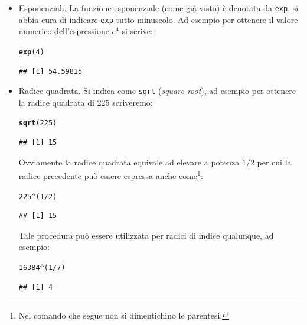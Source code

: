 \documentclass[onecolumn,11pt]{book}\usepackage[]{graphicx}\usepackage[]{color}
\makeatletter
\newcommand{\hlnum}[1]{\textcolor[rgb]{0.686,0.059,0.569}{#1}}%
\newcommand{\hlopt}[1]{\textcolor[rgb]{0,0,0}{#1}}%
\newcommand{\hlstd}[1]{\textcolor[rgb]{0.345,0.345,0.345}{#1}}%
\newcommand{\hlkwd}[1]{\textcolor[rgb]{0.737,0.353,0.396}{\textbf{#1}}}%
\newenvironment{kframe}{%
 \def\at@end@of@kframe{}%
 \ifinner\ifhmode%
  \def\at@end@of@kframe{\end{minipage}}%
  \begin{minipage}{\columnwidth}%
 \fi\fi%
 \def\FrameCommand##1{\hskip\@totalleftmargin \hskip-\fboxsep
 \colorbox{shadecolor}{##1}\hskip-\fboxsep
     \hskip-\linewidth \hskip-\@totalleftmargin \hskip\columnwidth}%
 \MakeFramed {\advance\hsize-\width
   \@totalleftmargin\z@ \linewidth\hsize
   \@setminipage}}%
 {\par\unskip\endMakeFramed%
 \at@end@of@kframe}
\newenvironment{knitrout}{}{} %
\makeatother
\begin{document}
\begin{itemize}
\item{}Esponenziali.\vskip10pt
La funzione esponenziale (come gi\`a visto) \`e denotata da
\texttt{exp}, si abbia cura di indicare \texttt{exp} tutto minuscolo.
Ad esempio per ottenere il valore numerico dell'espressione $e^4$ si scrive:
\begin{knitrout}
\color{fgcolor}\begin{kframe}
\begin{alltt}
\hlkwd{exp}\hlstd{(}\hlnum{4}\hlstd{)}
\end{alltt}
\begin{verbatim}
## [1] 54.59815
\end{verbatim}
\end{kframe}
\end{knitrout}
\item{}Radice quadrata.\vskip10pt
Si indica come \texttt{sqrt} (\textit{square root}), ad esempio per ottenere la radice quadrata di 225 scriveremo:
\begin{knitrout}
\color{fgcolor}\begin{kframe}
\begin{alltt}
\hlkwd{sqrt}\hlstd{(}\hlnum{225}\hlstd{)}
\end{alltt}
\begin{verbatim}
## [1] 15
\end{verbatim}
\end{kframe}
\end{knitrout}
Ovviamente la radice quadrata equivale ad elevare a potenza $1/2$ per cui la radice precedente pu\`o essere espressa anche come\footnote{Nel comando che segue non si dimentichino le parentesi.}:
\begin{knitrout}
\color{fgcolor}\begin{kframe}
\begin{alltt}
\hlnum{225}\hlopt{^}\hlstd{(}\hlnum{1}\hlopt{/}\hlnum{2}\hlstd{)}
\end{alltt}
\begin{verbatim}
## [1] 15
\end{verbatim}
\end{kframe}
\end{knitrout}
Tale procedura pu\`o essere utilizzata per radici di indice qualunque, ad esempio:
\begin{knitrout}
\color{fgcolor}\begin{kframe}
\begin{alltt}
\hlnum{16384}\hlopt{^}\hlstd{(}\hlnum{1}\hlopt{/}\hlnum{7}\hlstd{)}
\end{alltt}
\begin{verbatim}
## [1] 4
\end{verbatim}
\end{kframe}
\end{knitrout}


\end{itemize}
\end{document}
